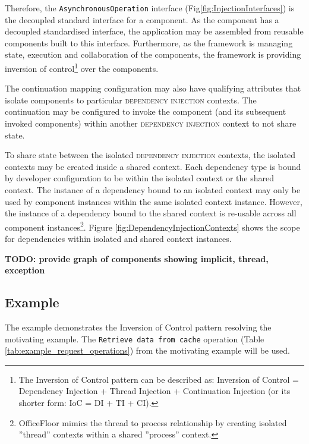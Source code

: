 \documentclass[prodmode]{style/acmlarge}
\begin{document}
Therefore, the \texttt{AsynchronousOperation} interface
(Fig\ref{fig:InjectionInterfaces}) is the decoupled standard interface for a
component.  As the component has a decoupled standardised interface, the
application may be assembled from reusable components built to this interface. 
Furthermore, as the framework is managing state, execution and collaboration of
the components, the framework is providing inversion of control\footnote{The
Inversion of Control pattern can be described as: Inversion of Control =
Dependency Injection + Thread Injection + Continuation Injection (or its shorter
form: IoC = DI + TI + CI).} over the components.


The continuation mapping configuration may also have qualifying attributes that
isolate components to particular \textsc{dependency injection} contexts.  The
continuation may be configured to invoke the component (and its subsequent
invoked components) within another \textsc{dependency injection} context to not
share state.

To share state between the isolated \textsc{dependency injection} contexts, the
isolated contexts may be created inside a shared context.  Each dependency type
is bound by developer configuration to be within the isolated context or the
shared context.  The instance of a dependency bound to an isolated context may
only be used by component instances within the same isolated context instance. 
However, the instance of a dependency bound to the shared context is re-usable
across all component instances\footnote{OfficeFloor \cite{officefloor} mimics
the thread to process relationship by creating isolated ''thread'' contexts
within a shared ''process'' context.}.  Figure
\ref{fig:DependencyInjectionContexts} shows the scope for dependencies within
isolated and shared context instances.

\textbf{TODO: provide graph of components showing implicit, thread, exception}


\subsection{Example}

The example demonstrates the Inversion of Control pattern resolving the
motivating example.  The \texttt{Retrieve data from cache} operation (Table
\ref{tab:example_request_operations}) from the motivating example will be used.  
\end{document}
